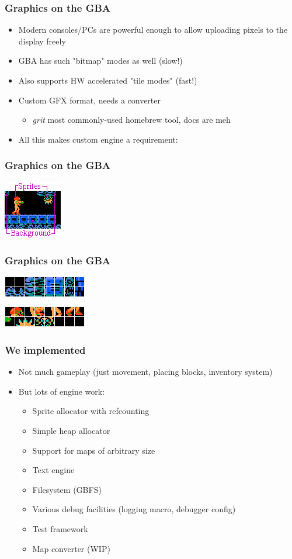 \documentclass{beamer}
\begin{document}
\begin{frame}
	\frametitle{Graphics on the GBA}
	\begin{itemize}
		\item Modern consoles/PCs are powerful enough to allow uploading pixels to the display freely
		\item GBA has such "bitmap" modes as well (slow!)
		\item Also supports HW accelerated "tile modes" (fast!)
		\item Custom GFX format, needs a converter \begin{itemize}
			      \item \emph{grit} most commonly-used homebrew tool, docs are meh
		      \end{itemize}
		\item All this makes custom engine a requirement:
	\end{itemize}
\end{frame}

\begin{frame}
	\frametitle{Graphics on the GBA}
	\includegraphics[scale=2.0]{images/tile_gfx_render.png}
\end{frame}

\begin{frame}
	\frametitle{Graphics on the GBA}
	\includegraphics[scale=2.0]{images/tile_gfx_tileset.png}
\end{frame}

\begin{frame}
	\frametitle{We implemented}
	\begin{itemize}
		\item Not much gameplay (just movement, placing blocks, inventory system)
		\item But lots of engine work: \begin{itemize}
			      \item Sprite allocator with refcounting
			      \item Simple heap allocator
			      \item Support for maps of arbitrary size
			      \item Text engine
			      \item Filesystem (GBFS)
			      \item Various debug facilities (logging macro, debugger config)
			      \item Test framework
			      \item Map converter (WIP)
		      \end{itemize}
	\end{itemize}
\end{frame}
\end{document}
